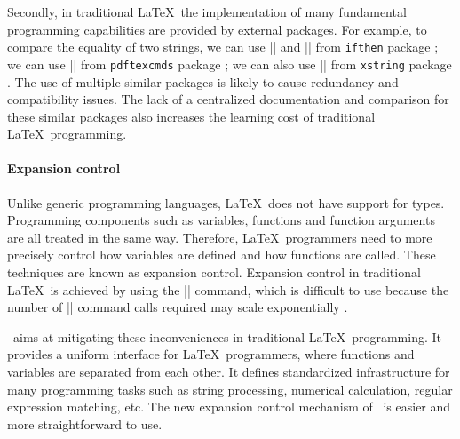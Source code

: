 \documentclass{ltugboat}
\begin{document}

Secondly, in traditional \LaTeX~the implementation of many fundamental programming capabilities are provided by external packages.
For example, to compare the equality of two strings, we can use \inltex|\ifthenelse| and \inltex|\equal| from \verb|ifthen| package \cite{pkg:ifthen};
we can use \inltex|\pdfstrcmp| from \verb|pdftexcmds| package \cite{pkg:pdftexcmds};
we can also use \inltex|\IfStrEq| from \verb|xstring| package \cite{pkg:xstring}. 
The use of multiple similar packages is likely to cause redundancy and compatibility issues.
The lack of a centralized documentation and comparison for these similar packages also increases the learning cost of traditional \LaTeX\ programming.

\paragraph{Expansion control} 


Unlike generic programming languages, \LaTeX\ does not have support for types.
Programming components such as variables, functions and function arguments are all treated in the same way.
Therefore, \LaTeX~programmers need to more precisely control how variables are defined and how functions are called. 
These techniques are known as expansion control. 
Expansion control in traditional \LaTeX~is achieved by using the \inltex|\expandafter| command, which is difficult to use because the number of \inltex|\expandafter| command calls required may scale exponentially \cite{bechtolsheim1988tutorial}.

\liii~aims at mitigating these inconveniences in traditional \LaTeX\ programming.
It provides a uniform interface for \LaTeX~programmers, where functions and variables are separated from each other. 
It defines standardized infrastructure for many programming tasks such as string processing, numerical calculation, regular expression matching, etc.
The new expansion control mechanism of \liii\ is easier and more straightforward to use.
\end{document}
